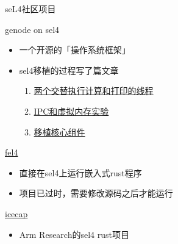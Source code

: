 \documentclass[presentation,dvipdfmx,CJKbookmarks]{beamer}
\begin{document}
\begin{CJK*}{UTF8}{simsun}
\begin{frame}[label={sec:org6d9a9a3}]{seL4\thinspace 社区项目}
\begin{block}{genode on sel4}
\begin{itemize}
\item 一个开源的「操作系统框架」
\item sel4\thinspace 移植的过程写了\thinspace 篇文章
\begin{enumerate}
\item \href{https://genode.org/documentation/articles/sel4\_part\_1}{两个交替执行计算和打印的线程}
\item \href{https://genode.org/documentation/articles/sel4\_part\_2}{IPC\thinspace 和虚拟内存实验}
\item \href{https://genode.org/documentation/articles/sel4\_part\_3}{移植核心组件}
\end{enumerate}
\end{itemize}
\end{block}
\begin{block}{\href{https://github.com/PolySync/cargo-fel4}{fel4}}
\begin{itemize}
\item 直接在\thinspace sel4\thinspace 上运行嵌入式\thinspace rust\thinspace 程序
\item 项目已过时，需要修改源码之后才能运行
\end{itemize}
\end{block}
\begin{block}{\href{https://gitlab.com/arm-research/security/icecap/icecap/}{icecap}}
\begin{itemize}
\item Arm Research\thinspace 的\thinspace sel4 rust\thinspace 项目
\end{itemize}
\end{block}
\end{frame}


\end{CJK*}
\end{document}
